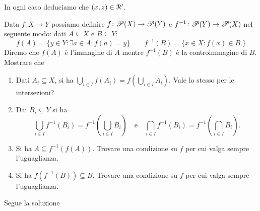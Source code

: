 \documentclass[a4paper]{article}\par \usepackage{style}\par
\begin{document}
\begin{itemize}
  In ogni caso deduciamo che $ (x, z) \in \Rel' $.
\end{itemize}\par \begin{es}
  Data $ f \colon X \to Y $ possiamo definire $ f \colon \P(X) \to \P(Y) $ e $ f^{-1} \colon \P(Y) \to \P(X) $ nel seguente modo: dati $ A \subseteq X $ e $ B \subseteq Y $:
  \[f(A) = \{y \in Y : \exists a \in A : f(a) = y\} \qquad f^{-1}(B) = \{x \in X : f(x) \in B.\}\]
  Diremo che $ f(A) $ è l'immagine di $ A $ mentre $ f^{-1}(B) $ è la controimmagine di $ B $. Mostrare che
  \begin{enumerate}
  \item Dati $ A_i \subseteq X $, si ha $ \bigcup_{i \in I} f(A_i) = f \left (\bigcup_{i \in I} A_i \right ) $. Vale lo stesso per le intersezioni?
  \item Dai $ B_i \subseteq Y $ si ha \[ \bigcup_{i \in I} f^{-1}(B_i) = f^{-1} \left (\bigcup_{i \in I} B_i \right ) \quad \text{e} \quad \bigcap_{i \in I} f^{-1}(B_i) = f^{-1} \left (\bigcap_{i \in I} B_i \right ).\]
  \item Si ha $ A \subseteq f^{-1}(f(A)) $. Trovare una condizione su $ f $ per cui valga sempre l'uguaglianza.
  \item Si ha $ f(f^{-1}(B)) \subseteq B $. Trovare una condizione su $ f $ per cui valga sempre l'uguaglianza.
  \end{enumerate}
\end{es}\par Segue la soluzione
\end{document}
